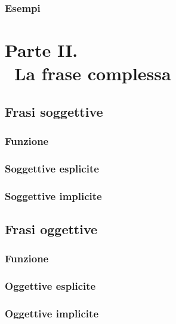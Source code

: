 \documentclass[a4paper,twoside,11pt,chapterprefix=false,bibliography=totocnumbered,listof=flat]{scrbook}
\begin{document}
\hypertarget{esempi}{%
\section{Esempi}\label{esempi}}

\part*{Parte II. \\\ La frase complessa}

\hypertarget{frasi-soggettive}{%
\chapter{Frasi soggettive}\label{frasi-soggettive}}

\hypertarget{funzione}{%
\section{Funzione}\label{funzione}}

\hypertarget{soggettive-esplicite}{%
\section{Soggettive esplicite}\label{soggettive-esplicite}}

\hypertarget{soggettive-implicite}{%
\section{Soggettive implicite}\label{soggettive-implicite}}

\hypertarget{frasi-oggettive}{%
\chapter{Frasi oggettive}\label{frasi-oggettive}}

\hypertarget{funzione-1}{%
\section{Funzione}\label{funzione-1}}

\hypertarget{oggettive-esplicite}{%
\section{Oggettive esplicite}\label{oggettive-esplicite}}

\hypertarget{oggettive-implicite}{%
\section{Oggettive implicite}\label{oggettive-implicite}}
\end{document}
